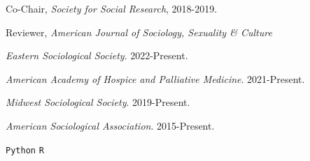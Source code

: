 \documentclass[11pt,article,oneside]{memoir}
\begin{document}
\ind Co-Chair, \emph{Society for Social Research}, 2018-2019.

\ind Reviewer, \emph{American Journal of Sociology, Sexuality \& Culture}

\medskip
{}
\medskip

\ind \emph{Eastern Sociological Society}. 2022-Present.

\ind \emph{American Academy of Hospice and Palliative Medicine}. 2021-Present.

\ind \emph{Midwest Sociological Society}. 2019-Present.

\ind \emph{American Sociological Association}. 2015-Present.

\medskip
{}
\medskip

\ind  \texttt{Python} \hspace{0.4in}  \texttt{R} \hspace{0.4in}
\end{document}
